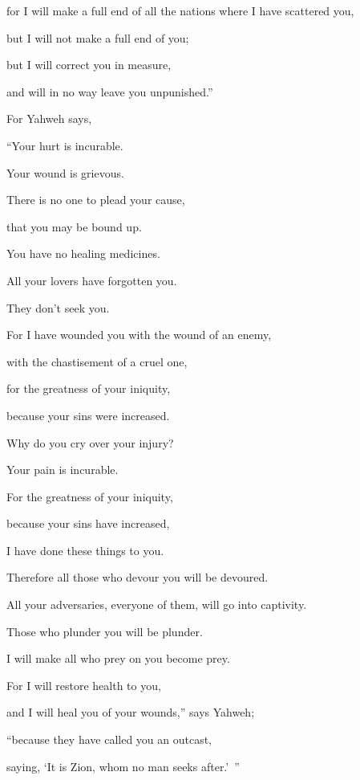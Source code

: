 {\par }{\QB for I will make a full end of all the nations where I have scattered you,
\par }{\QB but I will not make a full end of you;
\par }{\Q but I will correct you in measure,
\par }{\QB and will in no way leave you unpunished.”
\par }{\PP {}For Yahweh says,
\par }{\Q “Your hurt is incurable.
\par }{\QB Your wound is grievous.
\par }{\Q {}There is no one to plead your cause,
\par }{\QB that you may be bound up.
\par }{\QB You have no healing medicines.
\par }{\Q {}All your lovers have forgotten you.
\par }{\QB They don’t seek you.
\par }{\Q For I have wounded you with the wound of an enemy,
\par }{\QB with the chastisement of a cruel one,
\par }{\Q for the greatness of your iniquity,
\par }{\QB because your sins were increased.
\par }{\Q {}Why do you cry over your injury?
\par }{\QB Your pain is incurable.
\par }{\Q For the greatness of your iniquity,
\par }{\QB because your sins have increased,
\par }{\QB I have done these things to you.
\par }{\Q {}Therefore all those who devour you will be devoured.
\par }{\QB All your adversaries, everyone of them, will go into captivity.
\par }{\Q Those who plunder you will be plunder.
\par }{\QB I will make all who prey on you become prey.
\par }{\Q {}For I will restore health to you,
\par }{\QB and I will heal you of your wounds,” says Yahweh;
\par }{\Q “because they have called you an outcast,
\par }{\QB saying, ‘It is Zion, whom no man seeks after.’ ”
}
